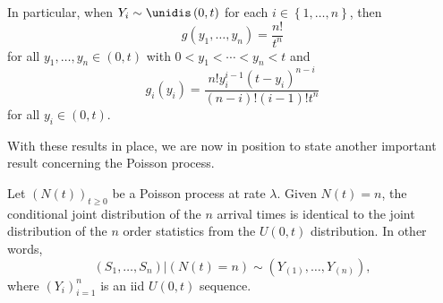 \documentclass[stat333]{subfiles}
\begin{document}
\begin{subproof}[Answer]
        In particular, when $Y_i\sim\unidis\left( 0,t \right)$ for each $i\in\left\lbrace 1,\ldots,n \right\rbrace$, then
        \begin{equation*}
            g\left( y_1,\ldots,y_n \right) = \frac{n!}{t^n}
        \end{equation*}
        for all $y_1,\ldots,y_n\in\left( 0,t \right)$ with $0<y_1<\cdots<y_n<t$ and
        \begin{equation*}
            g_i\left( y_i \right) = \frac{n!y_i^{i-1}\left( t-y_i \right)^{n-i}}{\left( n-i \right)!\left( i-1 \right)!t^n}
        \end{equation*}
        for all $y_i\in\left( 0,t \right)$.
    \end{subproof}

    \noindent With these results in place, we are now in position to state another important result concerning the Poisson process.

    \begin{prop}{}
        Let $\left( N\left( t \right) \right)^{}_{t\geq 0}$ be a Poisson process at rate $\lambda$. Given $N\left( t \right)=n$, the conditional joint distribution of the $n$ arrival times is identical to the joint distribution of the $n$ order statistics from the $U\left( 0,t \right)$ distribution. In other words,
        \begin{equation*}
            \left( S_1,\ldots,S_n \right)|\left( N\left( t \right)=n \right)\sim\left( Y_{\left( 1 \right)},\ldots,Y_{\left( n \right)} \right),
        \end{equation*}
        where $\left( Y_{i} \right)^{n}_{i=1}$ is an iid $U\left( 0,t \right)$ sequence.
    \end{prop}
\end{document}
